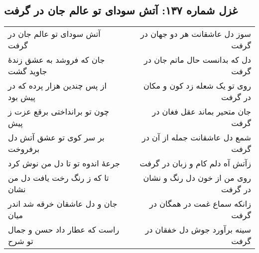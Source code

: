 \begin{center}
\section*{غزل شماره ۱۳۷: آتش سودای تو عالم جان در گرفت}
\label{sec:137}
\begin{longtable}{l p{0.5cm} r}
آتش سودای تو عالم جان در گرفت
&&
سوز دل عاشقانت هر دو جهان در گرفت
\\
جان که فروشد به عشق زندهٔ جاوید گشت
&&
دل که بدانست حال ماتم جان در گرفت
\\
از پس چندین هزار پرده که در پیش بود
&&
روی تو یک شعله زد کون و مکان در گرفت
\\
چون تو برانداختی برقع عزت ز پیش
&&
جان متحیر بماند عقل فغان در گرفت
\\
بر سر کوی تو عشق آتش دل برفروخت
&&
شمع دل عاشقانت جمله از آن در گرفت
\\
جرعهٔ اندوه تو تا دل من نوش کرد
&&
زآتش آه دلم کام و زبان در گرفت
\\
تا که ز رنگ رخت یافت دل من نشان
&&
روی من از خون دل رنگ و نشان در گرفت
\\
جان و دل عاشقان خرقه شد اندر میان
&&
زانکه سماع غمت در همگان در گرفت
\\
راست که عطار داد حسن و جمال تو شرح
&&
سینه برآورد جوش دل خفقان در گرفت
\\
\end{longtable}
\end{center}
